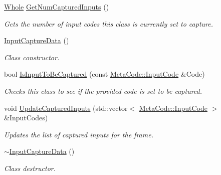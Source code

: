 \begin{DoxyCompactItemize}
\hyperlink{namespacephys_a460f6bc24c8dd347b05e0366ae34f34a}{Whole} \hyperlink{classphys_1_1UI_1_1InputCaptureData_ac1cbd55bfa9a161f8f545679620491d8}{GetNumCapturedInputs} ()
\begin{DoxyCompactList}\small\item\em Gets the number of input codes this class is currently set to capture. \item\end{DoxyCompactList}\item 
\hypertarget{classphys_1_1UI_1_1InputCaptureData_a3880b8daa9662bc5c117343040661563}{
\hyperlink{classphys_1_1UI_1_1InputCaptureData_a3880b8daa9662bc5c117343040661563}{InputCaptureData} ()}
\label{classphys_1_1UI_1_1InputCaptureData_a3880b8daa9662bc5c117343040661563}

\begin{DoxyCompactList}\small\item\em Class constructor. \item\end{DoxyCompactList}\item 
bool \hyperlink{classphys_1_1UI_1_1InputCaptureData_a2f22f9d9e8259b8687bfb5dfa8be960d}{IsInputToBeCaptured} (const \hyperlink{classphys_1_1MetaCode_a3e501cbb5bf0f6f1fdb7211465bda8d8}{MetaCode::InputCode} \&Code)
\begin{DoxyCompactList}\small\item\em Checks this class to see if the provided code is set to be captured. \item\end{DoxyCompactList}\item 
void \hyperlink{classphys_1_1UI_1_1InputCaptureData_ac6ed81ccf6e1fc7ac8c86b71ef7ed6d0}{UpdateCapturedInputs} (std::vector$<$ \hyperlink{classphys_1_1MetaCode_a3e501cbb5bf0f6f1fdb7211465bda8d8}{MetaCode::InputCode} $>$ \&InputCodes)
\begin{DoxyCompactList}\small\item\em Updates the list of captured inputs for the frame. \item\end{DoxyCompactList}\item 
\hypertarget{classphys_1_1UI_1_1InputCaptureData_a7bd115ce3c6ab7e3a886c26ea99407a5}{
\hyperlink{classphys_1_1UI_1_1InputCaptureData_a7bd115ce3c6ab7e3a886c26ea99407a5}{$\sim$InputCaptureData} ()}
\label{classphys_1_1UI_1_1InputCaptureData_a7bd115ce3c6ab7e3a886c26ea99407a5}

\begin{DoxyCompactList}\small\item\em Class destructor. \item\end{DoxyCompactList}\end{DoxyCompactItemize}
